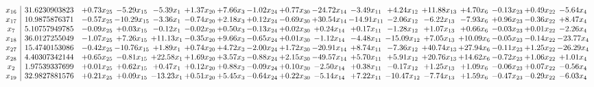 \documentclass[9pt]{article}
\begin{document}
 \[\begin{array}{c| c c@{\hskip 2pt} c@{\hskip 2pt} c@{\hskip 2pt} c@{\hskip 2pt} c@{\hskip 2pt} c@{\hskip 2pt} c@{\hskip 2pt} c@{\hskip 2pt} c@{\hskip 2pt} c@{\hskip 2pt} c@{\hskip 2pt} c@{\hskip 2pt} c@{\hskip 2pt} c@{\hskip 2pt} c@{\hskip 2pt} }
 x_{16}   &  31.6230903823 & +  0.73 x_{25} & -5.29 x_{15} & -5.39 x_{1} & +  1.37 x_{20} & +  7.66 x_{3} & -1.02 x_{24} & +  0.77 x_{30} & -24.72 x_{14} & -3.49 x_{11} & +  4.24 x_{12} & + 11.88 x_{13} & +  4.70 x_{6} & -0.13 x_{23} & +  0.49 x_{22} & -5.64 x_{4}\\
 x_{17}   &  10.9875876371 & -0.57 x_{25} & -10.29 x_{15} & -3.36 x_{1} & -0.74 x_{20} & +  2.18 x_{3} & +  0.12 x_{24} & -0.69 x_{30} & + 30.54 x_{14} & -14.91 x_{11} & -2.06 x_{12} & -6.22 x_{13} & -7.93 x_{6} & +  0.96 x_{23} & -0.36 x_{22} & +  8.47 x_{4}\\
 x_{7}   &  5.10757949785 & -0.09 x_{25} & +  0.03 x_{15} & -0.12 x_{1} & -0.02 x_{20} & +  0.50 x_{3} & -0.13 x_{24} & +  0.02 x_{30} & +  0.24 x_{14} & +  0.17 x_{11} & -1.28 x_{12} & +  1.07 x_{13} & +  0.66 x_{6} & -0.03 x_{23} & +  0.01 x_{22} & -2.26 x_{4}\\
 x_{18}   &  36.0127255049 & -1.07 x_{25} & +  7.26 x_{15} & + 11.13 x_{1} & -0.35 x_{20} & +  9.66 x_{3} & -0.65 x_{24} & +  0.01 x_{30} & -1.12 x_{14} & -4.48 x_{11} & -15.09 x_{12} & +  7.05 x_{13} & + 10.09 x_{6} & -0.05 x_{23} & -0.14 x_{22} & -23.77 x_{4}\\
 x_{27}   &  15.4740153086 & -0.42 x_{25} & -10.76 x_{15} & +  1.89 x_{1} & +  0.74 x_{20} & +  4.72 x_{3} & -2.00 x_{24} & +  1.72 x_{30} & -20.91 x_{14} & +  8.74 x_{11} & -7.36 x_{12} & + 40.74 x_{13} & + 27.94 x_{6} & -0.11 x_{23} & +  1.25 x_{22} & -26.29 x_{4}\\
 x_{28}   &  4.40307342144 & +  0.65 x_{25} & -0.81 x_{15} & + 22.58 x_{1} & +  1.69 x_{20} & +  3.57 x_{3} & -0.88 x_{24} & +  2.15 x_{30} & -49.57 x_{14} & +  5.70 x_{11} & +  5.91 x_{12} & + 20.76 x_{13} & + 14.62 x_{6} & -0.72 x_{23} & +  1.06 x_{22} & +  1.01 x_{4}\\
 x_{2}   &  1.97539337699 & +  0.01 x_{25} & +  0.62 x_{15} & +  0.47 x_{1} & +  0.12 x_{20} & +  0.88 x_{3} & -0.09 x_{24} & +  0.10 x_{30} & -2.50 x_{14} & +  0.38 x_{11} & -0.17 x_{12} & +  1.25 x_{13} & +  1.09 x_{6} & -0.06 x_{23} & +  0.07 x_{22} & -0.56 x_{4}\\
 x_{19}   &  32.9827881576 & +  0.21 x_{25} & +  0.09 x_{15} & -13.23 x_{1} & +  0.51 x_{20} & +  5.45 x_{3} & -0.64 x_{24} & +  0.22 x_{30} & -5.14 x_{14} & +  7.22 x_{11} & -10.47 x_{12} & -7.74 x_{13} & +  1.59 x_{6} & -0.47 x_{23} & -0.29 x_{22} & -6.03 x_{4}\\

\end{array}\]
\end{document}
